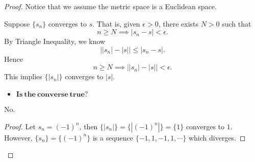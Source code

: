 \begin{Exercise}
	\begin{proof}
		Notice that we assume the metric space is a Euclidean space.
		
		Suppose $\{s_n\}$ converges to $s$. That is, given $\epsilon>0$, there exists $N>0$ such that
		$$
		n\geq N \implies |s_n-s| < \epsilon.
		$$
		By Triangle Inequality, we know
		$$
		\left| |s_n|-|s| \right| \leq |s_n-s|.
		$$
		Hence
		$$
		n\geq N \implies \left| |s_n|-|s| \right| < \epsilon.
		$$
		This implies $\{|s_n|\}$ converges to $|s|$.
		
		\begin{itemize}
			\item $\mathbf{Is\ the\ converse\ true?}$
		\end{itemize}
		\begin{answer}
			No.
		\end{answer}
		\begin{proof}
			Let $s_n = (-1)^n$, then $\{|s_n|\} = \{ |(-1)^n| \} = \{ 1 \}$ converges to $1$. However, $\{ s_n \} = \{ (-1)^n \}$ is a sequence $\{-1,1,-1,1,\cdots \}$ which diverges.
		\end{proof}
	\end{proof}
\end{Exercise}